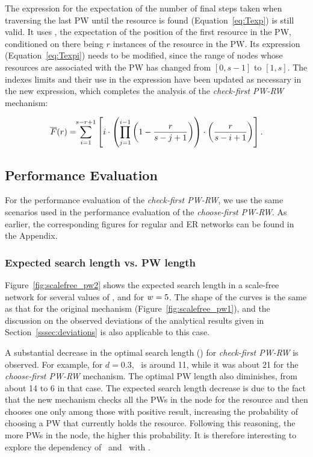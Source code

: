 \documentclass[]{elsarticle}
\begin{document}
The expression for the expectation of the number of final steps taken when traversing the last PW until the resource is found (Equation~\ref{eq:Texp}) is still valid. It uses , the expectation of the position of the first resource in the PW, conditioned on there being $r$ instances of the resource in the PW. Its expression (Equation~\ref{eq:Texpi}) needs to be modified, since the range of nodes whose resources are associated with the PW has changed from $[0,s-1]$ to $[1,s]$. The indexes limits and their use in the expression have been updated as necessary in the new expression, which completes the analysis of the \emph{check-first PW-RW} mechanism:

\begin{equation}
 \overline{F}(r) = \!\! \sum_{i=1}^{s-r+1} \left[ i \cdot \left( \prod_{j=1}^{i-1} \left( 1-\frac{r}{s-j+1} \right)  \right) \cdot \left(\frac{r}{s-i+1}\right) \right].
 \label{eq:Texpi_checkfirst}
\end{equation}

\subsection{Performance Evaluation}
\label{sec:perf_eval2}

For the performance evaluation of the \emph{check-first PW-RW}, we use the same scenarios used in the performance evaluation of the \emph{choose-first PW-RW}. As earlier, the corresponding figures for regular and ER networks can be found in the Appendix. \\

\subsubsection{Expected search length vs. PW length}

Figure~\ref{fig:scalefree_pw2} shows the expected search length in a scale-free network for several values of \pd, and for $w=5$. 
The shape of the curves is the same as that for the original mechanism (Figure~\ref{fig:scalefree_pw1}), 
and the discussion on the observed deviations of the analytical results given in Section~\ref{sssec:deviations} is also applicable to this case.

A substantial decrease in the optimal search length (\Lexpopt) for \emph{check-first PW-RW} is observed. For example, for $d=0.3$, \Lexpopt\ is around 11, while it was about 21 for the \emph{choose-first PW-RW} mechanism. The optimal PW length also diminishes, from about 14 to 6 in that case.
The expected search length decrease is due to the fact that the new mechanism checks all the PWs in the node for the resource and then chooses one only among those with positive result, increasing the probability of choosing a PW that currently holds the resource. Following this reasoning, the more PWs in the node, the higher this probability. It is therefore interesting to explore the dependency of \Lexp\ and \sopt\ with \w. 
\end{document}
